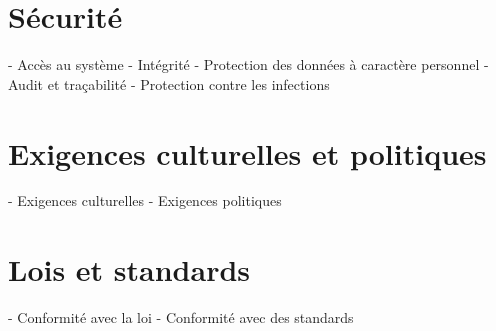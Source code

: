 \section{Sécurité}
- Accès au système
- Intégrité
- Protection des données à caractère personnel
- Audit et traçabilité
- Protection contre les infections

\section{Exigences culturelles et politiques}
- Exigences culturelles
- Exigences politiques

\section{Lois et standards}
- Conformité avec la loi
- Conformité avec des standards